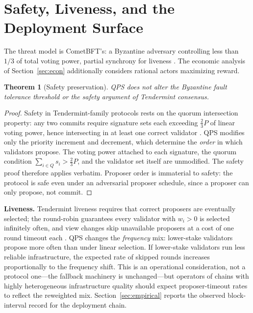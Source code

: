 \documentclass[11pt,a4paper]{article}
\newtheorem{theorem}{Theorem}
\begin{document}
\section{Safety, Liveness, and the Deployment Surface}
\label{sec:safety}

The threat model is CometBFT's: a Byzantine adversary controlling less than $1/3$ of total voting power, partial synchrony for liveness \cite{buchman,bravo}. The economic analysis of Section~\ref{sec:econ} additionally considers rational actors maximizing reward.

\begin{theorem}[Safety preservation]
\label{thm:safety}
QPS does not alter the Byzantine fault tolerance threshold or the safety argument of Tendermint consensus.
\end{theorem}

\begin{proof}
Safety in Tendermint-family protocols rests on the quorum intersection property: any two commits require signature sets each exceeding $\frac{2}{3}P$ of linear voting power, hence intersecting in at least one correct validator \cite{buchman}. QPS modifies only the priority increment and decrement, which determine the \emph{order} in which validators propose. The voting power attached to each signature, the quorum condition $\sum_{i \in Q} s_i > \frac{2}{3}P$, and the validator set itself are unmodified. The safety proof therefore applies verbatim. Proposer order is immaterial to safety: the protocol is safe even under an adversarial proposer schedule, since a proposer can only propose, not commit.
\end{proof}

\textbf{Liveness.} Tendermint liveness requires that correct proposers are eventually selected; the round-robin guarantees every validator with $w_i > 0$ is selected infinitely often, and view changes skip unavailable proposers at a cost of one round timeout each \cite{bravo}. QPS changes the \emph{frequency} mix: lower-stake validators propose more often than under linear selection. If lower-stake validators run less reliable infrastructure, the expected rate of skipped rounds increases proportionally to the frequency shift. This is an operational consideration, not a protocol one---the fallback machinery is unchanged---but operators of chains with highly heterogeneous infrastructure quality should expect proposer-timeout rates to reflect the reweighted mix. Section~\ref{sec:empirical} reports the observed block-interval record for the deployment chain.
\end{document}
